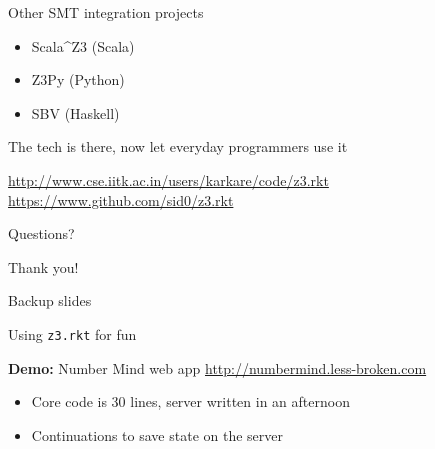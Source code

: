 \documentclass{beamer}
\begin{document}
\begin{frame}{Other SMT integration projects}
\begin{itemize}
\item Scala\textasciicircum Z3 (Scala)
\item Z3Py (Python)
\item SBV (Haskell)
\end{itemize}
\pause
The tech is there, now let everyday programmers use it
\begin{center}
\url{http://www.cse.iitk.ac.in/users/karkare/code/z3.rkt}
\url{https://www.github.com/sid0/z3.rkt}
\end{center}
\end{frame}

\begin{frame}{Questions?}
\begin{center}
Thank you!
\end{center}
\end{frame}

\begin{frame}
Backup slides
\end{frame}

\begin{frame}{Using \texttt{z3.rkt} for fun}
\begin{center}
\textbf{Demo:} Number Mind web app \url{http://numbermind.less-broken.com}
\end{center}
\pause
\begin{itemize}
\item Core code is 30 lines, server written in an afternoon
\item Continuations to save state on the server
\end{itemize}
\end{frame}
\end{document}
